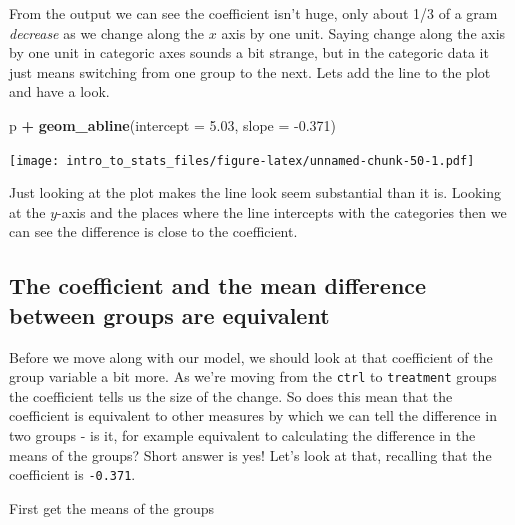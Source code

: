 \documentclass[
]{book}
\newenvironment{Shaded}{\begin{snugshade}}{\end{snugshade}}
\newcommand{\DataTypeTok}[1]{\textcolor[rgb]{0.13,0.29,0.53}{#1}}
\newcommand{\FloatTok}[1]{\textcolor[rgb]{0.00,0.00,0.81}{#1}}
\newcommand{\KeywordTok}[1]{\textcolor[rgb]{0.13,0.29,0.53}{\textbf{#1}}}
\newcommand{\NormalTok}[1]{#1}
\newcommand{\OperatorTok}[1]{\textcolor[rgb]{0.81,0.36,0.00}{\textbf{#1}}}
\newcommand{\StringTok}[1]{\textcolor[rgb]{0.31,0.60,0.02}{#1}}
\begin{document}
From the output we can see the coefficient isn't huge, only about 1/3 of a gram \emph{decrease} as we change along the \(x\) axis by one unit. Saying change along the axis by one unit in categoric axes sounds a bit strange, but in the categoric data it just means switching from one group to the next. Lets add the line to the plot and have a look.

\begin{Shaded}
\begin{Highlighting}[]
\NormalTok{p }\OperatorTok{+}\StringTok{ }\KeywordTok{geom_abline}\NormalTok{(}\DataTypeTok{intercept =} \FloatTok{5.03}\NormalTok{, }\DataTypeTok{slope =} \FloatTok{-0.371}\NormalTok{)}
\end{Highlighting}
\end{Shaded}

\texttt{[image: intro\_to\_stats\_files/figure-latex/unnamed-chunk-50-1.pdf]}

Just looking at the plot makes the line look seem substantial than it is. Looking at the \(y\)-axis and the places where the line intercepts with the categories then we can see the difference is close to the coefficient.

\hypertarget{the-coefficient-and-the-mean-difference-between-groups-are-equivalent}{%
\subsection{The coefficient and the mean difference between groups are equivalent}\label{the-coefficient-and-the-mean-difference-between-groups-are-equivalent}}

Before we move along with our model, we should look at that coefficient of the group variable a bit more. As we're moving from the \texttt{ctrl} to \texttt{treatment} groups the coefficient tells us the size of the change. So does this mean that the coefficient is equivalent to other measures by which we can tell the difference in two groups - is it, for example equivalent to calculating the difference in the means of the groups? Short answer is yes! Let's look at that, recalling that the coefficient is \texttt{-0.371}.

First get the means of the groups

\begin{Shaded}
\end{Shaded}
\end{document}
